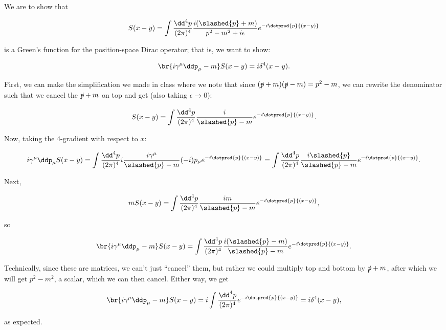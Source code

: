 \section{}

We are to show that 

\begin{equation}
    S(x-y) = \int\frac{\dd^4p}{(2\pi)^4} \frac{i(\slashed{p} + m)}{p^2 - m^2 + i\epsilon}e^{-i\dotprod{p}{(x-y)}}
\end{equation}

is a Green's function for the position-space Dirac operator; that is, we want to show:

\begin{equation}
    \br{i\gamma^{\mu}\ddp_{\mu} - m}S(x-y) = i\delta^4(x-y).
\end{equation}

First, we can make the simplification we made in class where we note that since $(\slashed{p}+m)(\slashed{p}-m) = p^2-m$, we can rewrite the denominator such that we cancel the $\slashed{p}+m$ on top and get (also taking $\epsilon \rightarrow 0$):

\begin{equation}
    S(x-y) = \int\frac{\dd^4p}{(2\pi)^4} \frac{i}{\slashed{p} - m}e^{-i\dotprod{p}{(x-y)}}.
\end{equation}

Now, taking the 4-gradient with respect to $x$:

\begin{equation*}
    i\gamma^{\mu}\ddp_{\mu} S(x-y) = \int\frac{\dd^4p}{(2\pi)^4} i\frac{i\gamma^{\mu}}{\slashed{p}-m}(-i)p_{\mu}e^{-i\dotprod{p}{(x-y)}} = \int\frac{\dd^4p}{(2\pi)^4} \frac{i\slashed{p}}{\slashed{p} - m}e^{-i\dotprod{p}{(x-y)}}.
\end{equation*}

Next,

\begin{equation*}
    mS(x-y) = \int\frac{\dd^4p}{(2\pi)^4} \frac{im}{\slashed{p} - m}e^{-i\dotprod{p}{(x-y)}},
\end{equation*}

so

\begin{equation*}
    \br{i\gamma^{\mu}\ddp_{\mu} - m}S(x-y) = \int\frac{\dd^4p}{(2\pi)^4} \frac{i(\slashed{p}-m)}{\slashed{p}-m}e^{-i\dotprod{p}{(x-y)}}.
\end{equation*}

Technically, since these are matrices, we can't just ``cancel'' them, but rather we could multiply top and bottom by $\slashed{p}+m$, after which we will get $p^2-m^2$, a scalar, which we can then cancel. Either way, we get

\begin{equation*}
    \br{i\gamma^{\mu}\ddp_{\mu} - m}S(x-y) = i\int\frac{\dd^4p}{(2\pi)^4} e^{-i\dotprod{p}{(x-y)}} = i\delta^4(x-y),
\end{equation*}

as expected.
